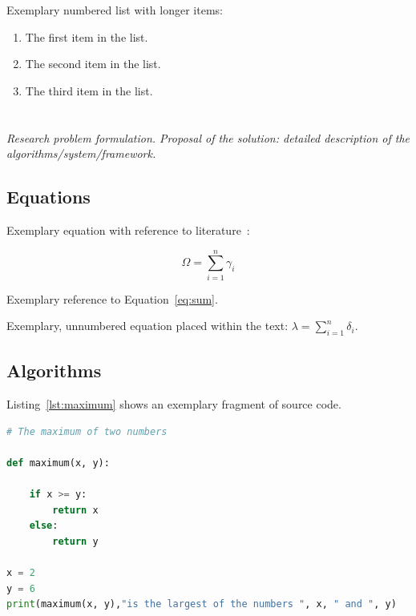 \documentclass[english]{projectreport}
\begin{document}
Exemplary numbered list with longer items:
\begin{enumerate}
\item The first item in the list.
\item The second item in the list.
\item The third item in the list.
\end{enumerate}


\section{\SectionTitleProblemSolution}
\label{sec:solution}


\emph{Research problem formulation. Proposal of the solution: detailed description of the algorithms/system/framework.}


\subsection{Equations}
\label{sec:equations}

Exemplary equation with reference to literature~\cite{author2021title}:

\begin{equation}
\Omega = \sum_{i=1}^n \gamma_i
\label{eq:sum}
\end{equation}

Exemplary reference to Equation~\eqref{eq:sum}.

Exemplary, unnumbered equation placed within the text: $\lambda = \sum_{i=1}^n \delta_i$.

\subsection{Algorithms}
\label{sec:algorithms}

Listing~\ref{lst:maximum} shows an exemplary fragment of source code.

\begin{lstlisting}[language=Python,float=!htbp,caption={Exemplary fragment of source code (source:
  \cite{author2021title})},label=lst:maximum]
# The maximum of two numbers

def maximum(x, y):

    if x >= y:
        return x
    else:
        return y

x = 2
y = 6
print(maximum(x, y),"is the largest of the numbers ", x, " and ", y)

\end{lstlisting}
\end{document}
